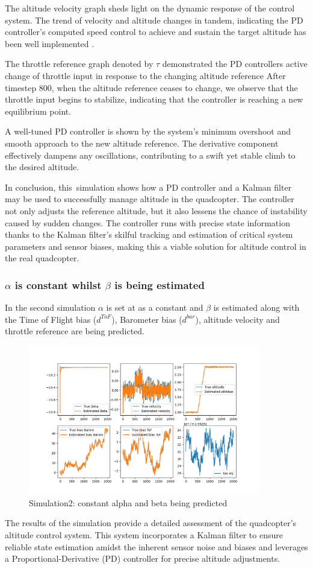 \documentclass{article}
\begin{document}
The altitude velocity graph sheds light on the dynamic response of the control system. The trend of velocity and altitude changes in tandem, indicating the PD controller's computed speed control to achieve and sustain the target altitude has been well implemented .

The throttle reference graph denoted by \(\tau\) demonstrated the PD controllers active change of throttle input in response to the changing altitude reference After timestep 800, when the altitude reference ceases to change, we observe that the throttle input begins to stabilize, indicating that the controller is reaching a new equilibrium point.

A well-tuned PD controller is shown by the system's minimum overshoot and smooth approach to the new altitude reference. The derivative component effectively dampens any oscillations, contributing to a swift yet stable climb to the desired altitude.

In conclusion, this simulation shows how a PD controller and a Kalman filter may be used to successfully manage altitude in the quadcopter. The controller not only adjusts the reference altitude, but it also lessens the chance of instability caused by sudden changes. The controller runs with precise state information thanks to the Kalman 
filter's skilful tracking and estimation of critical system parameters and sensor biases, making this a viable solution for altitude control in the real quadcopter. 

\subsubsection*{\(\alpha\) is constant whilst \(\beta\) is being estimated}
In the second simulation \(\alpha\) is set at as a constant and \(\beta\) is estimated along with the Time of Flight bias (\(d^{ToF}\)), Barometer bias (\(d^{bar}\)), altitude velocity and throttle reference are being predicted.
\begin{figure}[H]
  \centering
  \includegraphics[width=0.9\textwidth]{Pictures/a_constant_PD.png}
  \caption{Simulation2: constant alpha and beta being predicted}
  \label{fig:a_constant_PD}
\end{figure}
The results of the simulation provide a detailed assessment of the quadcopter's altitude control system. This system incorporates a Kalman filter to ensure reliable state estimation amidst the inherent sensor noise and biases and leverages a Proportional-Derivative (PD) controller for precise altitude adjustments.
\end{document}
